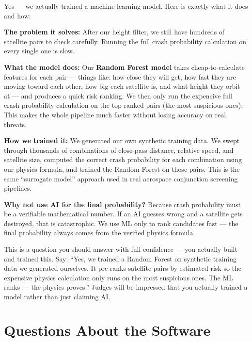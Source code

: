 \documentclass[11pt,a4paper]{article}
\begin{document}
\begin{answerbox}
Yes --- we actually trained a machine learning model. Here is exactly what it does and how:

\textbf{The problem it solves:} After our height filter, we still have hundreds of satellite pairs to check carefully. Running the full crash probability calculation on every single one is slow.

\textbf{What the model does:} Our \textbf{Random Forest model} takes cheap-to-calculate features for each pair --- things like: how close they will get, how fast they are moving toward each other, how big each satellite is, and what height they orbit at --- and produces a quick risk ranking. We then only run the expensive full crash probability calculation on the top-ranked pairs (the most suspicious ones). This makes the whole pipeline much faster without losing accuracy on real threats.

\textbf{How we trained it:} We generated our own synthetic training data. We swept through thousands of combinations of close-pass distance, relative speed, and satellite size, computed the correct crash probability for each combination using our physics formula, and trained the Random Forest on those pairs. This is the same ``surrogate model'' approach used in real aerospace conjunction screening pipelines.

\textbf{Why not use AI for the final probability?} Because crash probability must be a verifiable mathematical number. If an AI guesses wrong and a satellite gets destroyed, that is catastrophic. We use ML only to rank candidates fast --- the final probability always comes from the verified physics formula.
\end{answerbox}

\begin{tipbox}
This is a question you should answer with full confidence --- you actually built and trained this. Say: ``Yes, we trained a Random Forest on synthetic training data we generated ourselves. It pre-ranks satellite pairs by estimated risk so the expensive physics calculation only runs on the most suspicious ones. The ML ranks --- the physics proves.'' Judges will be impressed that you actually trained a model rather than just claiming AI.
\end{tipbox}

\newpage
\section{Questions About the Software}
\end{document}
